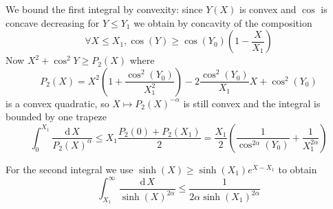 \documentclass[main.tex]{subfiles}
\renewcommand\d{\mathrm{d}\,}
\newcommand\abs[1]{\left|#1\right|}
\begin{document}
  We bound the first integral by convexity:
  since $Y(X)$ is convex and $\cos$ is concave decreasing for $Y\leq Y_1$ we
  obtain by concavity of the composition
  \begin{equation}
      \forall X\leq X_1, \cos(Y)\geq \cos(Y_0)(1-\frac{X}{X_1})
  \end{equation}
  Now $X^2+\cos^2Y\geq P_2(X)$ where
  \begin{equation}
     P_2(X) = X^2(1+\frac{\cos^2(Y_0)}{X_1^2})-2\frac{\cos^2(Y_0)}{X_1}X+\cos^2(Y_0)
  \end{equation}
  is a convex quadratic, so $X\mapsto P_2(X)^{-α}$ is still convex and the integral
  is bounded by one trapeze
  \begin{equation}
      \int_0^{X_1}\frac{\d X}{P_2(X)^α}\leq X_1\frac{P_2(0)+P_2(X_1)}2
      = \frac{X_1}2\left(\frac1{\cos^{2α}(Y_0)}+\frac1{X_1^{2α}}\right)
  \end{equation}

  For the second integral we use
  $\sinh(X)\geq\sinh(X_1)e^{X-X_1}$ to obtain
  \begin{equation}
      \int_{X_1}^\infty \frac{\d X}{\sinh(X)^{2α}} \leq \frac1{2α\sinh(X_1)^{2α}}
  \end{equation}

\iffalse
  \begin{align}
      \sinh(x+iy) &= \sinh x\cos y+i\cosh x\sin y\\
      \cosh(x+iy) &= \cosh x\cos y+i\sinh x\sin y
  \end{align}
  so that writing $λ\sinh(t+iτ)=X+iY$ we express the integral in terms
  of $X,Y$ with
  \begin{align}
      X &= λ\sinh t\cosτ\\
      Y &= λ\cosh t\sinτ\\
      Y^2 =λ^2(\sin^2τ+\tan^2 τX^2)\\
      λ\cosh(t+iτ) &= λ\cosh t\cos τ+iλ\sinh t\sinτ \\
                     &= Y/\tan(τ) + i X\tan(τ)\\
      \abs{\cosh(X+iY)}^2
      &= \cosh^2 X\cos^2 Y+\sinh^2 X\sin^2 Y \label{eq:boundchcos}\\
      &= \sinh^2 X + \cos^2 Y \label{eq:boundchsh}
  \end{align}
\fi
\biblio      
\end{document}
